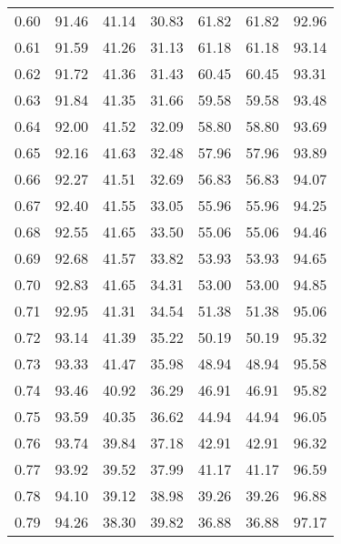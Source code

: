 \begin{tabular}{|c|c|c|c|c|c|c|}
      0.60 &     91.46 &     41.14 &      30.83 &   61.82 &      61.82 &         92.96 \\
      0.61 &     91.59 &     41.26 &      31.13 &   61.18 &      61.18 &         93.14 \\
      0.62 &     91.72 &     41.36 &      31.43 &   60.45 &      60.45 &         93.31 \\
      0.63 &     91.84 &     41.35 &      31.66 &   59.58 &      59.58 &         93.48 \\
      0.64 &     92.00 &     41.52 &      32.09 &   58.80 &      58.80 &         93.69 \\
      0.65 &     92.16 &     41.63 &      32.48 &   57.96 &      57.96 &         93.89 \\
      0.66 &     92.27 &     41.51 &      32.69 &   56.83 &      56.83 &         94.07 \\
      0.67 &     92.40 &     41.55 &      33.05 &   55.96 &      55.96 &         94.25 \\
      0.68 &     92.55 &     41.65 &      33.50 &   55.06 &      55.06 &         94.46 \\
      0.69 &     92.68 &     41.57 &      33.82 &   53.93 &      53.93 &         94.65 \\
      0.70 &     92.83 &     41.65 &      34.31 &   53.00 &      53.00 &         94.85 \\
      0.71 &     92.95 &     41.31 &      34.54 &   51.38 &      51.38 &         95.06 \\
      0.72 &     93.14 &     41.39 &      35.22 &   50.19 &      50.19 &         95.32 \\
      0.73 &     93.33 &     41.47 &      35.98 &   48.94 &      48.94 &         95.58 \\
      0.74 &     93.46 &     40.92 &      36.29 &   46.91 &      46.91 &         95.82 \\
      0.75 &     93.59 &     40.35 &      36.62 &   44.94 &      44.94 &         96.05 \\
      0.76 &     93.74 &     39.84 &      37.18 &   42.91 &      42.91 &         96.32 \\
      0.77 &     93.92 &     39.52 &      37.99 &   41.17 &      41.17 &         96.59 \\
      0.78 &     94.10 &     39.12 &      38.98 &   39.26 &      39.26 &         96.88 \\
      0.79 &     94.26 &     38.30 &      39.82 &   36.88 &      36.88 &         97.17 \\

\end{tabular}

